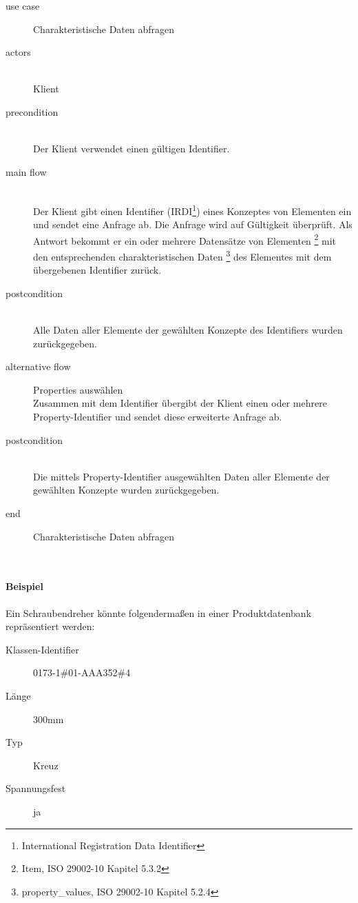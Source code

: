 {\small

\begin{description}
     \item[use case] Charakteristische Daten abfragen
     \item[  actors]~\\
     Klient
     \item[  precondition]~\\
     Der Klient verwendet einen gültigen Identifier.
     \item[  main flow]~\\
     Der Klient gibt einen Identifier (IRDI\footnote{International Registration Data Identifier}) eines Konzeptes von Elementen ein und sendet eine Anfrage ab. Die Anfrage wird auf Gültigkeit überprüft. Als Antwort bekommt er ein oder mehrere Datensätze von Elementen \footnote{Item, ISO 29002-10 Kapitel 5.3.2} mit den entsprechenden charakteristischen Daten \footnote{property\_values, ISO 29002-10 Kapitel 5.2.4}  des Elementes mit dem übergebenen Identifier zurück.
     \item[  postcondition]~\\
     Alle Daten aller Elemente der gewählten Konzepte des Identifiers wurden zurückgegeben.    
     \item[  alternative flow] Properties auswählen ~\\
     Zusammen mit dem Identifier übergibt der Klient einen oder mehrere Property-Identifier und sendet diese erweiterte Anfrage ab.    
     \item[  postcondition]~\\
     Die mittels Property-Identifier ausgewählten Daten aller Elemente der gewählten Konzepte wurden zurückgegeben.    
     \item[end] Charakteristische Daten abfragen
\end{description}

~\\

} %

\paragraph{Beispiel}\label{lab:schraubendreher}

Ein Schraubendreher könnte folgendermaßen in einer Produktdatenbank repräsentiert werden:

\begin{description}
\item[Klassen-Identifier] 0173-1\#01-AAA352\#4 
\item[Länge] 300mm
\item[Typ] Kreuz
\item[Spannungsfest] ja
\end{description}

